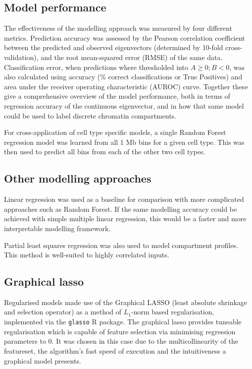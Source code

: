 \documentclass[a4paper,10pt,oneside]{book}
\begin{document}
\subsection{Model performance}\label{model-performance}

The effectiveness of the modelling approach was measured by four
different metrics. Prediction accuracy was assessed by the Pearson
correlation coefficient between the predicted and observed eigenvectors
(determined by 10-fold cross-validation), and the root mean-squared
error (RMSE) of the same data. Classification error, when predictions
where thresholded into $A \geq 0; B < 0$, was also calculated using
accuracy (\% correct classifications or True Positives) and area under
the receiver operating characteristic (AUROC) curve. Together these give
a comprehensive overview of the model performance, both in terms of
regression accuracy of the continuous eigenvector, and in how that same
model could be used to label discrete chromatin compartments.

For cross-application of cell type specific models, a single Random
Forest regression model was learned from all 1 Mb bins for a given cell
type. This was then used to predict all bins from each of the other two
cell types.

\subsection{Other modelling approaches}
 
Linear regression was used as a baseline for comparison with more complicated approaches such as Random Forest. If the same modelling accuracy could be achieved with simple multiple linear regression, this would be a faster and more interpretable modelling framework.

Partial least squares regression was also used to model compartment profiles. This method is well-suited to highly correlated inputs.

\subsection{Graphical lasso}
Regularised models made use of the Graphical LASSO\cite{Friedman2008}
(least absolute shrinkage and selection operator) as a method of
$L_1$-norm based
regularisation, implemented via the \texttt{glasso} R package. The
graphical lasso provides tuneable regularisation which is
capable of feature selection via minimising regression parameters to
0. It was chosen in this case due to the multicollinearity of the
featureset, the algorithm's fast speed of
execution and the intuitiveness a graphical model
presents.\cite{Friedman2008} \\
\end{document}
